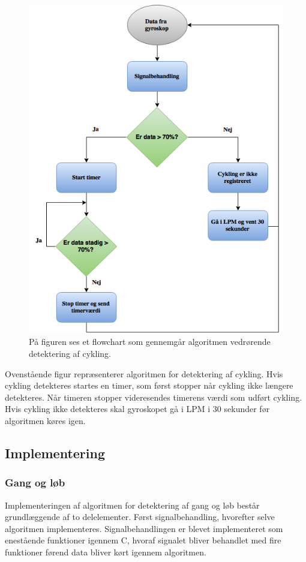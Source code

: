 \begin{figure}[H]
	\centering
	\includegraphics[scale=0.6]{figures/cDesign/algoritme_cykling.png}
	\caption{På figuren ses et flowchart som gennemgår algoritmen vedrørende detektering af cykling.}
	\label{fig:algoritme_cykling}
\end{figure}

Ovenstående figur repræsenterer algoritmen for detektering af cykling. Hvis cykling detekteres startes en timer, som først stopper når cykling ikke længere detekteres. Når timeren stopper videresendes timerens værdi som udført cykling. Hvis cykling ikke detekteres skal gyroskopet gå i LPM i 30 sekunder før algoritmen køres igen. 


\subsection{Implementering}
\subsubsection{Gang og løb}
Implementeringen af algoritmen for detektering af gang og løb består grundlæggende af to delelementer. Først signalbehandling, hvorefter selve algoritmen implementeres. Signalbehandlingen er blevet implementeret som enestående funktioner igennem C, hvoraf signalet bliver behandlet med fire funktioner førend data bliver kørt igennem algoritmen.

